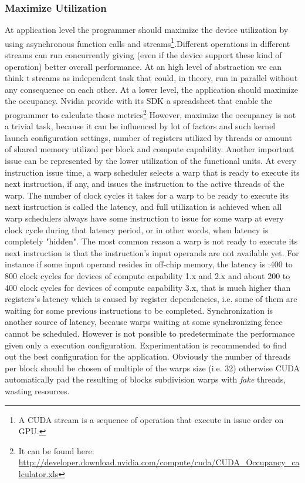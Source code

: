 \subsubsection{Maximize Utilization}
At application level the programmer should maximize the device utilization by
using asynchronous function calls and streams\footnote{A CUDA stream is a
sequence of operation that execute in issue order on GPU.}.Different operations
in different streams can run concurrently giving (even if the device support
these kind of operation) better overall performance. At an high level of
abstraction we can think t streams as independent task that could, in theory,
run in parallel without any consequence on each other. At a lower level, the
application should maximize the occupancy. Nvidia provide with its SDK
a spreadsheet that enable the programmer to calculate those metrics\footnote{It can
be found here:
\url{http://developer.download.nvidia.com/compute/cuda/CUDA\_Occupancy_calculator.xls}}
However, maximize the occupancy is not a trivial task, because it can be
influenced by lot of factors and such kernel launch configuration settings,
number of registers utilized by threads or amount of shared memory utilized per block and compute capability.
Another important issue can be represented by the lower utilization of the
functional units. At every instruction issue time, a warp scheduler selects a
warp that is ready to execute its next instruction, if any, and issues the
instruction to the active threads of the warp. The number of clock cycles it
takes for a warp to be ready to execute its next instruction is called the
latency, and full utilization is achieved when all warp schedulers always have
some instruction to issue for some warp at every clock cycle during that latency
period, or in other words, when latency is completely "hidden".
The most common reason a warp is not ready to execute its next instruction is
that the instruction's input operands are not available yet.
For instance if some input operand resides in off-chip memory, the latency is
:400 to 800 clock cycles for devices of  compute capability 1.x and 2.x and
about 200 to 400 clock cycles for devices of compute capability 3.x, that is
much higher than registers's latency which is caused by register dependencies,
i.e. some of them are waiting for some previous instructions to be completed.
Synchronization is another source of latency, because warps waiting at some
synchronizing fence cannot be scheduled.
However is not possible to predeterminate the performance given only a execution
configuration. Experimentation is recommended to find out the best configuration
for the application. Obviously the number of threads per block should be chosen
of multiple of the warps size (i.e. 32) otherwise CUDA automatically pad
the resulting of blocks subdivision warps with \emph{fake} threads, wasting
resources.

